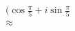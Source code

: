 \documentclass[preview]{standalone}
\begin{document}
\begin{align*}
(\cos\frac{\pi}{5} + i\sin\frac{\pi}{5} \\ \approx
\end{align*}
\end{document}
